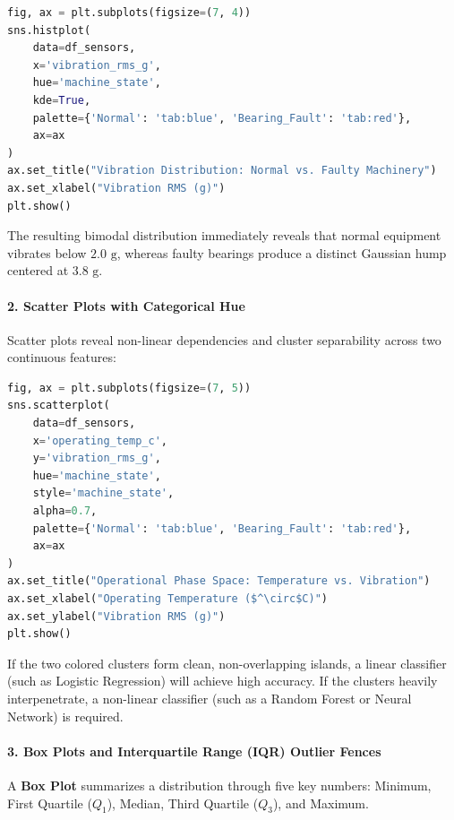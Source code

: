 \begin{lstlisting}[language=Python]
fig, ax = plt.subplots(figsize=(7, 4))
sns.histplot(
    data=df_sensors, 
    x='vibration_rms_g', 
    hue='machine_state', 
    kde=True, 
    palette={'Normal': 'tab:blue', 'Bearing_Fault': 'tab:red'},
    ax=ax
)
ax.set_title("Vibration Distribution: Normal vs. Faulty Machinery")
ax.set_xlabel("Vibration RMS (g)")
plt.show()
\end{lstlisting}
The resulting bimodal distribution immediately reveals that normal equipment vibrates below $2.0\text{ g}$, whereas faulty bearings produce a distinct Gaussian hump centered at $3.8\text{ g}$.

\paragraph{2. Scatter Plots with Categorical Hue}
Scatter plots reveal non-linear dependencies and cluster separability across two continuous features:

\begin{lstlisting}[language=Python]
fig, ax = plt.subplots(figsize=(7, 5))
sns.scatterplot(
    data=df_sensors, 
    x='operating_temp_c', 
    y='vibration_rms_g', 
    hue='machine_state',
    style='machine_state',
    alpha=0.7,
    palette={'Normal': 'tab:blue', 'Bearing_Fault': 'tab:red'},
    ax=ax
)
ax.set_title("Operational Phase Space: Temperature vs. Vibration")
ax.set_xlabel("Operating Temperature ($^\circ$C)")
ax.set_ylabel("Vibration RMS (g)")
plt.show()
\end{lstlisting}
If the two colored clusters form clean, non-overlapping islands, a linear classifier (such as Logistic Regression) will achieve high accuracy. If the clusters heavily interpenetrate, a non-linear classifier (such as a Random Forest or Neural Network) is required.

\paragraph{3. Box Plots and Interquartile Range (IQR) Outlier Fences}
A \textbf{Box Plot} summarizes a distribution through five key numbers: Minimum, First Quartile ($Q_1$), Median, Third Quartile ($Q_3$), and Maximum.

